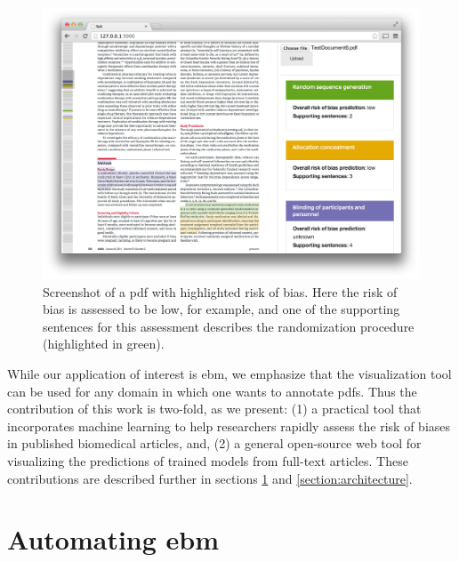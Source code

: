 \documentclass[runningheads,a4paper]{llncs}
\begin{document}
\begin{figure}[htb]
\vspace{-1em}
\centering
\includegraphics[width=0.8\linewidth]{./images/screenshot2.png}
\vspace{-1em}
\caption{\label{fig:screenshot}Screenshot of a \ac{pdf} with highlighted risk of bias. Here the risk of bias is assessed to be low, for example, and one of the supporting sentences for this assessment describes the randomization procedure (highlighted in green).}
\vspace{-1em}
\end{figure}

While our application of interest is \ac{ebm}, we emphasize that the visualization tool can be used for any domain in which one wants to annotate \acp{pdf}.
Thus the contribution of this work is two-fold, as we present:
(1) a practical tool that incorporates machine learning to help researchers rapidly assess the risk of biases in published biomedical articles, and,
(2) a general open-source web tool for visualizing the predictions of trained models from full-text articles.
These contributions are described further in sections \ref{section:EBM-ML} and \ref{section:architecture}.

\section{Automating \acl{ebm}}
\label{section:EBM-ML}
\end{document}
